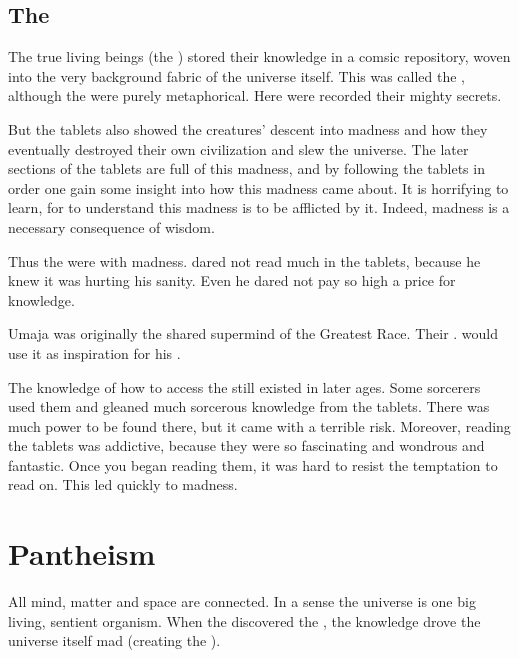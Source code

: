 









\subsection{The \UmajaTablets}
\index{\UmajaTablets}
The true living beings (the ) stored their knowledge in a comsic repository, woven into the very background fabric of the universe itself.
This was called the \UmajaTablets, although the  were purely metaphorical.
Here were recorded their mighty secrets.

But the tablets also showed the creatures' descent into madness and how they eventually destroyed their own civilization and slew the universe. 
The later sections of the tablets are full of this madness, and by following the tablets in order one gain some insight into how this madness came about. 
It is horrifying to learn, for to understand this madness is to be afflicted by it.
Indeed, madness is a necessary consequence of wisdom. 

Thus the \UmajaTablets were  with madness. 
\Sethicus dared not read much in the tablets, because he knew it was hurting his sanity. 
Even he dared not pay so high a price for knowledge. 

Umaja was originally the shared supermind of the Greatest Race. 
Their \nexus. 
 would use it as inspiration for his . 

The knowledge of how to access the \UmajaTablets still existed in later ages. 
Some sorcerers used them and gleaned much sorcerous knowledge from the tablets.
There was much power to be found there, but it came with a terrible risk.
Moreover, reading the tablets was addictive, because they were so fascinating and wondrous and fantastic. 
Once you began reading them, it was hard to resist the temptation to read on.
This led quickly to madness. 















\section{Pantheism}
All mind, matter and space are connected. 
In a sense the universe is one big living, sentient organism. 
When the  discovered the , the knowledge drove the universe itself mad (creating the ). 

